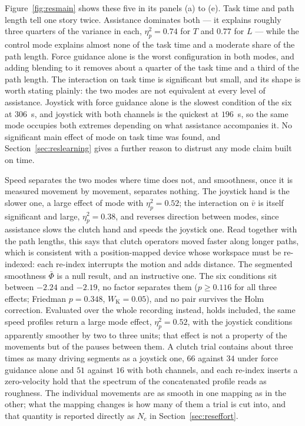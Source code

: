 \documentclass[12pt,a4paper,twoside,openright]{report}
\begin{document}
Figure~\ref{fig:resmain} shows these five in its panels (a) to (e). Task time and path length tell one story twice. Assistance dominates both --- it explains roughly three quarters of the variance in each, $\eta^2_p = 0.74$ for $T$ and $0.77$ for $L$ --- while the control mode explains almost none of the task time and a moderate share of the path length. Force guidance alone is the worst configuration in both modes, and adding blending to it removes about a quarter of the task time and a third of the path length. The interaction on task time is significant but small, and its shape is worth stating plainly: the two modes are not equivalent at every level of assistance. Joystick with force guidance alone is the slowest condition of the six at $306$~s, and joystick with both channels is the quickest at $196$~s, so the same mode occupies both extremes depending on what assistance accompanies it. No significant main effect of mode on task time was found, and Section~\ref{sec:reslearning} gives a further reason to distrust any mode claim built on time.

Speed separates the two modes where time does not, and smoothness, once it is measured movement by movement, separates nothing. The joystick hand is the slower one, a large effect of mode with $\eta^2_p = 0.52$; the interaction on $\bar{v}$ is itself significant and large, $\eta^2_p = 0.38$, and reverses direction between modes, since assistance slows the clutch hand and speeds the joystick one. Read together with the path lengths, this says that clutch operators moved faster along longer paths, which is consistent with a position-mapped device whose workspace must be re-indexed: each re-index interrupts the motion and adds distance. The segmented smoothness $\bar\Phi$ is a null result, and an instructive one. The six conditions sit between $-2.24$ and $-2.19$, no factor separates them ($p \ge 0.116$ for all three effects; Friedman $p = 0.348$, $W_{\mathrm{K}} = 0.05$), and no pair survives the Holm correction. Evaluated over the whole recording instead, holds included, the same speed profiles return a large mode effect, $\eta^2_p = 0.52$, with the joystick conditions apparently smoother by two to three units; that effect is not a property of the movements but of the pauses between them. A clutch trial contains about three times as many driving segments as a joystick one, $66$ against $34$ under force guidance alone and $51$ against $16$ with both channels, and each re-index inserts a zero-velocity hold that the spectrum of the concatenated profile reads as roughness. The individual movements are as smooth in one mapping as in the other; what the mapping changes is how many of them a trial is cut into, and that quantity is reported directly as $N_c$ in Section~\ref{sec:reseffort}.
\end{document}
